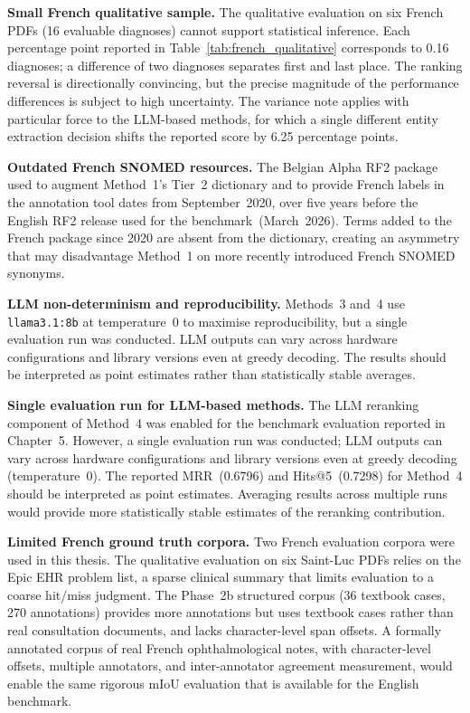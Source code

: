 \textbf{Small French qualitative sample.} The qualitative evaluation on six French PDFs (16 evaluable diagnoses) cannot support statistical inference. Each percentage point reported in Table~\ref{tab:french_qualitative} corresponds to 0.16 diagnoses; a difference of two diagnoses separates first and last place. The ranking reversal is directionally convincing, but the precise magnitude of the performance differences is subject to high uncertainty. The variance note applies with particular force to the LLM-based methods, for which a single different entity extraction decision shifts the reported score by 6.25 percentage points.

\textbf{Outdated French SNOMED resources.} The Belgian Alpha RF2 package used to augment Method~1's Tier~2 dictionary and to provide French labels in the annotation tool dates from September~2020, over five years before the English RF2 release used for the benchmark~(March~2026). Terms added to the French package since 2020 are absent from the dictionary, creating an asymmetry that may disadvantage Method~1 on more recently introduced French SNOMED synonyms.

\textbf{LLM non-determinism and reproducibility.} Methods~3 and~4 use \texttt{llama3.1:8b} at temperature~0 to maximise reproducibility, but a single evaluation run was conducted. LLM outputs can vary across hardware configurations and library versions even at greedy decoding. The results should be interpreted as point estimates rather than statistically stable averages.

\textbf{Single evaluation run for LLM-based methods.} The LLM reranking component of Method~4 was enabled for the benchmark evaluation reported in Chapter~5. However, a single evaluation run was conducted; LLM outputs can vary across hardware configurations and library versions even at greedy decoding (temperature~0). The reported MRR~(0.6796) and Hits@5~(0.7298) for Method~4 should be interpreted as point estimates. Averaging results across multiple runs would provide more statistically stable estimates of the reranking contribution.

\textbf{Limited French ground truth corpora.} Two French evaluation corpora were used in this thesis. The qualitative evaluation on six Saint-Luc PDFs relies on the Epic EHR problem list, a sparse clinical summary that limits evaluation to a coarse hit/miss judgment. The Phase~2b structured corpus (36 textbook cases, 270 annotations) provides more annotations but uses textbook cases rather than real consultation documents, and lacks character-level span offsets. A formally annotated corpus of real French ophthalmological notes, with character-level offsets, multiple annotators, and inter-annotator agreement measurement, would enable the same rigorous mIoU evaluation that is available for the English benchmark.

